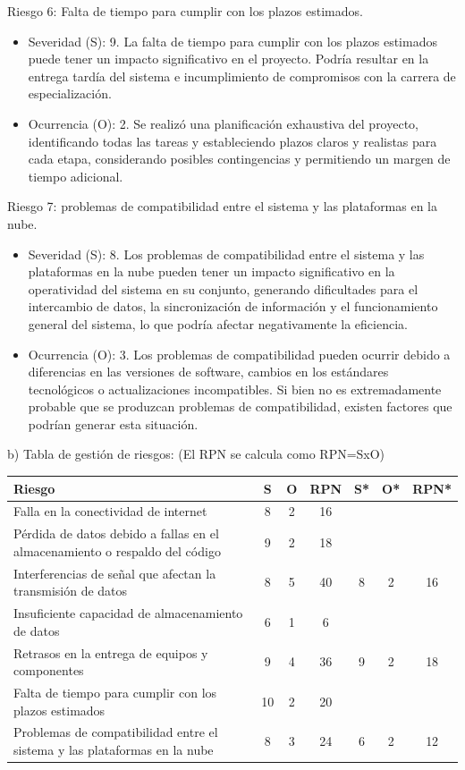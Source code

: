 \documentclass[
11pt, %
]{charter}
\begin{document}
Riesgo 6: Falta de tiempo para cumplir con los plazos estimados.
\begin{itemize}
	\item Severidad (S): 9. La falta de tiempo para cumplir con los plazos estimados puede tener un impacto significativo en el proyecto. Podría resultar en la entrega tardía del sistema e incumplimiento de compromisos con la carrera de especialización.
	\item Ocurrencia (O): 2. Se realizó una planificación exhaustiva del proyecto, identificando todas las tareas y estableciendo plazos claros y realistas para cada etapa, considerando posibles contingencias y permitiendo un margen de tiempo adicional.
\end{itemize}

Riesgo 7: problemas de compatibilidad entre el sistema y las plataformas en la nube.
\begin{itemize}
	\item Severidad (S): 8. Los problemas de compatibilidad entre el sistema y las plataformas en la nube pueden tener un impacto significativo en la operatividad del sistema en su conjunto, generando dificultades para el intercambio de datos, la sincronización de información y el funcionamiento general del sistema, lo que podría afectar negativamente la eficiencia.
	\item Ocurrencia (O): 3. Los problemas de compatibilidad pueden ocurrir debido a diferencias en las versiones de software, cambios en los estándares tecnológicos o actualizaciones incompatibles. Si bien no es extremadamente probable que se produzcan problemas de compatibilidad, existen factores que podrían generar esta situación.
\end{itemize}


b) Tabla de gestión de riesgos:      (El RPN se calcula como RPN=SxO)

\begin{table}[htpb]
\centering
\begin{tabularx}{\linewidth}{@{}|X|c|c|c|c|c|c|@{}}
\hline
\rowcolor[HTML]{C0C0C0} 
Riesgo & S & O & RPN & S* & O* & RPN* \\ \hline
Falla en la conectividad de internet       & 8  & 2  &  16   &    &    &      \\ \hline
Pérdida de datos debido a fallas en el almacenamiento o respaldo del código & 9  & 2  &  18   &    &    &      \\ \hline
Interferencias de señal que afectan la transmisión de datos  &  8 & 5  &  40   &  8  &  2  & 16     \\ \hline
Insuficiente capacidad de almacenamiento de datos & 6  & 1  &  6   &    &    &      \\ \hline
Retrasos en la entrega de equipos y componentes       & 9  & 4  &  36   &  9  &  2  & 18     \\ \hline
Falta de tiempo para cumplir con los plazos estimados & 10  & 2 & 20  &    &    &      \\ \hline
Problemas de compatibilidad entre el sistema y las plataformas en la nube & 8  & 3  &  24  &  6  & 2   &  12    \\ \hline
\end{tabularx}%
\end{table}
\end{document}
